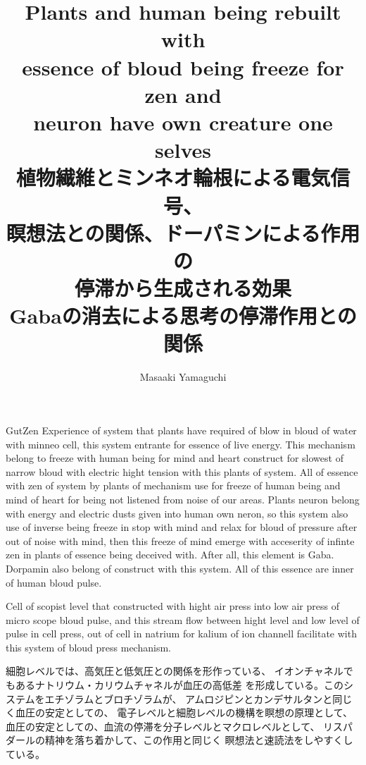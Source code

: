 \documentclass{jsarticle}
\begin{document}
\title{Plants and human being rebuilt with \\
essence of bloud being freeze for zen and \\
neuron have own creature one selves \\
植物繊維とミンネオ輪根による電気信号、\\
瞑想法との関係、ドーパミンによる作用の \\
停滞から生成される効果 \\
Gabaの消去による思考の停滞作用との関係}
\author{Masaaki Yamaguchi}
\date{}
\maketitle

      GutZen Experience of system that plants have required of
   blow in bloud of water with minneo cell, this system entrante
   for essence of live energy. This mechanism belong to freeze
   with human being for mind and heart construct for slowest of
   narrow bloud with electric hight tension with this plants of system.
   All of essence with zen of system by plants of mechanism use for
   freeze of human being and mind of heart for being not listened 
   from noise of our areas.
   Plants neuron belong with energy and electric dusts 
   given into human own neron, so this system also use of inverse being freeze
   in stop with mind and relax for bloud of pressure after out of noise 
   with mind, then this freeze of mind emerge with acceserity of infinte 
   zen in plants of essence being deceived with.
   After all, this element is Gaba.
   Dorpamin also belong of construct with this system.
   All of this essence are inner of human bloud pulse.

      Cell of scopist level that constructed with hight air press into
   low air press of micro scope bloud pulse, and this stream flow
   between hight level and low level of pulse in cell press,
   out of cell in natrium for kalium of ion channell facilitate
   with this system of bloud press mechanism.

     細胞レベルでは、高気圧と低気圧との関係を形作っている、
   イオンチャネルでもあるナトリウム・カリウムチャネルが血圧の高低差
   を形成している。このシステムをエチゾラムとブロチゾラムが、
   アムロジピンとカンデサルタンと同じく血圧の安定としての、
   電子レベルと細胞レベルの機構を瞑想の原理として、
   血圧の安定としての、血流の停滞を分子レベルとマクロレベルとして、
   リスパダールの精神を落ち着かして、この作用と同じく
   瞑想法と速読法をしやすくしている。
\end{document}
